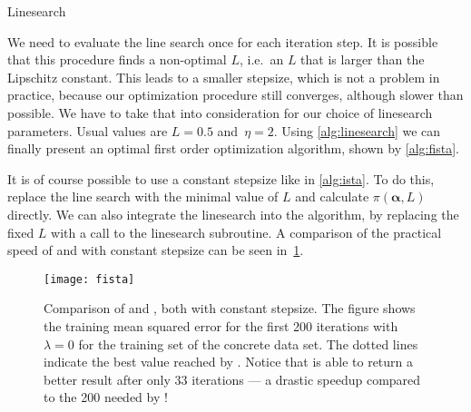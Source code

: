 \begin{algorithm}[h]
 \caption{Linesearch~\cite{fista}}\label{alg:linesearch}
 \begin{algorithmic}[1]
  \Statex
    \Do
    \State {} 
  \EndFunction
 \end{algorithmic}
\end{algorithm}

We need to evaluate the line search once for each iteration step.
It is possible that this procedure finds a non-optimal \(L\), i.e.~an \(L\) that
is larger than the Lipschitz constant.
This leads to a smaller stepsize, which is not a problem in practice, because
our optimization procedure still converges, although slower than possible.
We have to take that into consideration for our choice of linesearch parameters.
Usual values are \(L = 0.5\) and~\(\eta = 2\).
Using \cref{alg:linesearch} we can finally present an optimal first order optimization algorithm, shown by \cref{alg:fista}.

It is of course possible to use a constant stepsize like in \cref{alg:ista}.
To do this, replace the line search with the minimal value of \(L\) and
calculate \(\pi(\bm{\alpha}, L)\) directly.
We can also integrate the linesearch into the \ista algorithm, by replacing the
fixed \(L\) with a call to the linesearch subroutine.
A comparison of the practical speed of \ista and \fista with constant stepsize can be seen in~\cref{fig:fista-convergence}.

\begin{figure}[hT]
  \texttt{[image: fista]}
  \caption[Comparison of \fista and \ista]{Comparison of \fista and \ista, both with constant stepsize.
    The figure shows the training mean squared error for the first 200
    iterations with \(\lambda = 0\) for the training set of the concrete
    data set.
    The dotted lines indicate the best value reached by \ista.
    Notice that \fista is able to return a better result after only 33
    iterations ---
    a drastic speedup compared to the 200 needed by \ista!
  }\label{fig:fista-convergence}
\end{figure}

